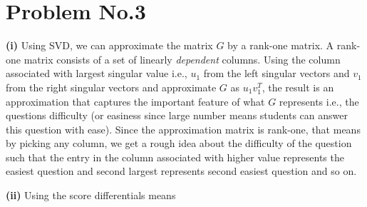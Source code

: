 \section*{Problem No.3} \label{sec:prob3}

\textbf{(i)} Using SVD, we can approximate the matrix $G$ by a rank-one matrix. A rank-one matrix consists of a set of linearly \emph{dependent} columns. Using the column associated with largest singular value i.e., $u_{1}$ from the left singular vectors and $v_{1}$ from the right singular vectors and approximate $G$ as $u_{1}v_{1}^{T}$, the result is an approximation that captures the important feature of what $G$ represents i.e., the questions difficulty (or easiness since large number means students can answer this question with ease). Since the approximation matrix is rank-one, that means by picking any column, we get a rough idea about the difficulty of the question such that the entry in the column associated with higher value represents the easiest question and second largest represents second easiest question and so on. 

\textbf{(ii)} 
Using the score differentials means 



